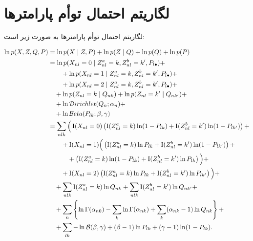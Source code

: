﻿%

\section{لگاریتم احتمال توأم پارامترها}
\label{sec:VBParamsUpdating}

لگاریتم احتمال توأم پارامترها به صورت زیر است:

\begin{align}
\ln \TrueProb{X, Z, Q, P} &= \ln \TrueCProb{X}{Z, P}
	+ \ln \TrueCProb{Z}{Q}
	+ \ln \TrueProb{Q}
	+ \ln \TrueProb{P}
\nonumber \\ %
	&= \ln \TrueCProb{X_{nl}=0}{Z_{nl}^a=k, Z_{nl}^b=k', P_{l \bullet}}	+						\nonumber \\
			& \qquad + \ln \TrueCProb{X_{nl}=1}{Z_{nl}^a=k, Z_{nl}^b=k', P_{l \bullet}} +		\nonumber \\
			& \qquad + \ln \TrueCProb{X_{nl}=2}{Z_{nl}^a=k, Z_{nl}^b=k', P_{l \bullet}} +		\nonumber \\
		& \quad + \ln \TrueCProb{Z_{nl}=k}{Q_{nk}} + \ln \TrueCProb{Z_{nl}=k'}{Q_{nk'}} +		\nonumber \\
		& \quad + \ln \Dir{Q_{n}; \alpha_n} +													\nonumber \\
		& \quad + \ln \BetaDist{P_{lk}; \beta}{\gamma}
\nonumber \\ %
	&= \sum_{nlk} \Big( \Big.
	\Indic{X_{nl} = 0} \left( \Indic{Z_{nl}^a = k} \ln (1 - P_{lk})
			+ \Indic{Z_{nl}^b = k'} \ln (1 - P_{lk'}) \right) +												\nonumber \\
		& \qquad + \Indic{X_{nl} = 1} \Big(
			\left( \Indic{Z_{nl}^a=k} \ln P_{lk} + \Indic{Z_{nl}^b=k'} \ln (1 - P_{lk'}) \right) +			\nonumber \\
		& \qquad \quad + \left( \Indic{Z_{nl}^a=k} \ln (1 - P_{lk}) + \Indic{Z_{nl}^b=k'} \ln P_{lk} \right)
		\Big) +																								\nonumber \\
		& \qquad + \Indic{X_{nl} = 2} \left( \Indic{Z_{nl}^a = k} \ln P_{lk}
			+ \Indic{Z_{nl}^b = k'} \ln P_{lk'} \right)
\Big. \Big) +
\nonumber \\ %
	& \quad + \sum_{nlk} \Indic{Z_{nl}^a = k} \ln Q_{nk}
		+ \sum_{nlk} \Indic{Z_{nl}^b = k'} \ln Q_{nk'} +
\nonumber \\ %
	& \quad + \sum_n \left\{
		\ln \GammaFunc{\alpha_{n0}}
		- \sum_{k} \ln \GammaFunc{\alpha_{nk}}
		+ \sum_{k} (\alpha_{nk} - 1) \ln Q_{nk}
	\right\} +
\nonumber \\ %
	& \quad + \sum_{lk} - \ln \BetaFunc{\beta}{\gamma}
	+ (\beta - 1) \ln P_{lk}
	+ (\gamma - 1) \ln (1 - P_{lk}).
\label{eq:LogJointProb}
\end{align}

